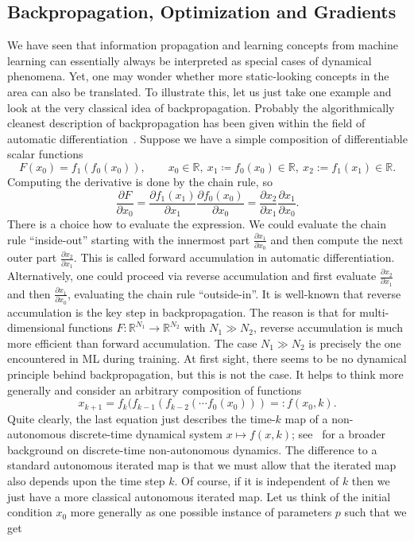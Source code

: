 \documentclass[10pt]{article}
\newcommand{\R}{{\mathbb R}}
\def\R{\mathbb{R}}
\def\ra{\rightarrow}
\newcommand{\benn}{\begin{equation*}}
\newcommand{\eenn}{\end{equation*}}
\begin{document}
\subsection{Backpropagation, Optimization and Gradients}
\label{cekk_sec:backpropagation}

We have seen that information propagation and learning concepts from machine learning can essentially always be interpreted as special cases of dynamical phenomena. Yet, one may wonder whether more static-looking concepts in the area can also be translated. To illustrate this, let us just take one example and look at the very classical idea of backpropagation. Probably the algorithmically cleanest description of backpropagation has been given within the field of automatic differentiation~\cite{Griewank1}. Suppose we have a simple composition of differentiable scalar functions 
\benn
F(x_0)=f_1(f_0(x_0)),\qquad x_0\in \R,~x_1\coloneqq f_0(x_0)\in\R,~x_2:=f_1(x_1)\in\R.
\eenn
Computing the derivative is done by the chain rule, so 
\benn
\frac{\partial F}{\partial x_0}=\frac{\partial f_1(x_1)}{\partial x_1} \frac{\partial f_0(x_0)}{\partial x_0}=\frac{\partial x_2}{\partial x_1} \frac{\partial x_1}{\partial x_0}.
\eenn
There is a choice how to evaluate the expression. We could evaluate the chain rule ``inside-out'' starting with the innermost part $\frac{\partial x_1}{\partial x_0}$ and then compute the next outer part $\frac{\partial x_2}{\partial x_1}$. This is called forward accumulation in automatic differentiation. Alternatively, one could proceed via reverse accumulation and first evaluate $\frac{\partial x_2}{\partial x_1}$ and then $\frac{\partial x_1}{\partial x_0}$, evaluating the chain rule ``outside-in''. It is well-known that reverse accumulation is the key step in backpropagation. The reason is that for multi-dimensional functions $F:\R^{N_1}\ra \R^{N_2}$ with $N_1\gg N_2$, reverse accumulation is much more efficient than forward accumulation. The case $N_1\gg N_2$ is precisely the one encountered in ML during training. At first sight, there seems to be no dynamical principle behind backpropagation, but this is not the case. It helps to think more generally and consider an arbitrary composition of functions
\benn
x_{k+1}=f_k( f_{k-1}(f_{k-2}( \cdots f_0(x_0) ))=:f(x_0,k).
\eenn   
Quite clearly, the last equation just describes the time-$k$ map of a non-autonomous discrete-time dynamical system $x\mapsto f(x,k)$; see~\cite{Poetzsche2} for a broader background on discrete-time non-autonomous dynamics. The difference to a standard autonomous iterated map is that we must allow that the iterated map also depends upon the time step $k$. Of course, if it is independent of $k$ then we just have a more classical autonomous iterated map. Let us think of the initial condition $x_0$ more generally as one possible instance of parameters $p$ such that we get
\end{document}
